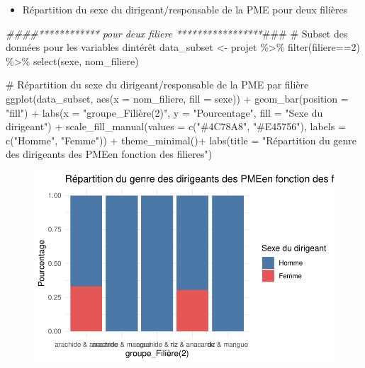 \documentclass[
  letterpaper,
  DIV=11,
  numbers=noendperiod]{scrartcl}
\newenvironment{Shaded}{\begin{snugshade}}{\end{snugshade}}
\newcommand{\AlertTok}[1]{\textcolor[rgb]{0.68,0.00,0.00}{#1}}
\newcommand{\AttributeTok}[1]{\textcolor[rgb]{0.40,0.45,0.13}{#1}}
\newcommand{\CommentTok}[1]{\textcolor[rgb]{0.37,0.37,0.37}{#1}}
\newcommand{\DecValTok}[1]{\textcolor[rgb]{0.68,0.00,0.00}{#1}}
\newcommand{\DocumentationTok}[1]{\textcolor[rgb]{0.37,0.37,0.37}{\textit{#1}}}
\newcommand{\FunctionTok}[1]{\textcolor[rgb]{0.28,0.35,0.67}{#1}}
\newcommand{\NormalTok}[1]{\textcolor[rgb]{0.00,0.23,0.31}{#1}}
\newcommand{\OtherTok}[1]{\textcolor[rgb]{0.00,0.23,0.31}{#1}}
\newcommand{\SpecialCharTok}[1]{\textcolor[rgb]{0.37,0.37,0.37}{#1}}
\newcommand{\StringTok}[1]{\textcolor[rgb]{0.13,0.47,0.30}{#1}}
\providecommand{\tightlist}{%
  \setlength{\itemsep}{0pt}\setlength{\parskip}{0pt}}\usepackage{longtable,booktabs,array}
\begin{document}
\begin{itemize}
\tightlist
\item
  Répartition du sexe du dirigeant/responsable de la PME pour deux
  filières
\end{itemize}

\begin{Shaded}
\begin{Highlighting}[]
\DocumentationTok{\#\#\#\#************ pour deux filiere *****************}\AlertTok{\#\#\#}
\CommentTok{\# Subset des données pour les variables d\textquotesingle{}intérêt}
\NormalTok{data\_subset }\OtherTok{\textless{}{-}}\NormalTok{ projet }\SpecialCharTok{\%\textgreater{}\%} \FunctionTok{filter}\NormalTok{(filiere}\SpecialCharTok{==}\DecValTok{2}\NormalTok{) }\SpecialCharTok{\%\textgreater{}\%} \FunctionTok{select}\NormalTok{(sexe, nom\_filiere)}


\CommentTok{\# Répartition du sexe du dirigeant/responsable de la PME par filière}
\FunctionTok{ggplot}\NormalTok{(data\_subset, }\FunctionTok{aes}\NormalTok{(}\AttributeTok{x =}\NormalTok{ nom\_filiere, }\AttributeTok{fill =}\NormalTok{ sexe)) }\SpecialCharTok{+}
  \FunctionTok{geom\_bar}\NormalTok{(}\AttributeTok{position =} \StringTok{"fill"}\NormalTok{) }\SpecialCharTok{+}
  \FunctionTok{labs}\NormalTok{(}\AttributeTok{x =} \StringTok{"groupe\_Filière(2)"}\NormalTok{, }\AttributeTok{y =} \StringTok{"Pourcentage"}\NormalTok{, }\AttributeTok{fill =} \StringTok{"Sexe du dirigeant"}\NormalTok{) }\SpecialCharTok{+}
  \FunctionTok{scale\_fill\_manual}\NormalTok{(}\AttributeTok{values =} \FunctionTok{c}\NormalTok{(}\StringTok{"\#4C78A8"}\NormalTok{, }\StringTok{"\#E45756"}\NormalTok{), }\AttributeTok{labels =} \FunctionTok{c}\NormalTok{(}\StringTok{"Homme"}\NormalTok{, }\StringTok{"Femme"}\NormalTok{)) }\SpecialCharTok{+}
  \FunctionTok{theme\_minimal}\NormalTok{()}\SpecialCharTok{+}
  \FunctionTok{labs}\NormalTok{(}\AttributeTok{title =} \StringTok{"Répartition du genre des dirigeants des PMEen fonction des filieres"}\NormalTok{)}
\end{Highlighting}
\end{Shaded}

\begin{figure}[H]

{\centering \includegraphics{projet_R_files/figure-pdf/unnamed-chunk-33-1.pdf}

}

\end{figure}
\end{document}
